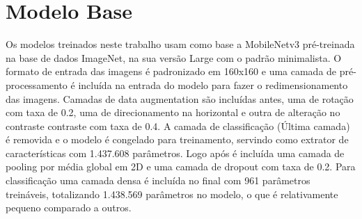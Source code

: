 \section{Modelo Base}

Os modelos treinados neste trabalho usam como base a MobileNetv3 \citep{MobileNetV3} pré-treinada na base de dados ImageNet, na sua versão Large com o padrão minimalista. O formato de entrada das imagens é padronizado em 160x160 e uma camada de pré-processamento é incluída na entrada do modelo para fazer o redimensionamento das imagens. Camadas de data augmentation são incluídas antes, uma de rotação com taxa de 0.2, uma de direcionamento na horizontal e outra de alteração no contraste contraste com taxa de 0.4. A camada de classificação (Última camada) é removida e o modelo é congelado para treinamento, servindo como extrator de características com 1.437.608 parâmetros. Logo após é incluída uma camada de pooling por média global em 2D e uma camada de dropout com taxa de 0.2. Para classificação uma camada densa é incluída no final com 961 parâmetros treináveis, totalizando 1.438.569 parâmetros no modelo, o que é relativamente pequeno comparado a outros.

